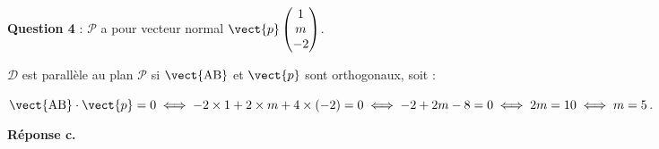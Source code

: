 \medskip

\textbf{Question 4} : %
$\mathcal{P}$ a pour vecteur normal $\vect{p}\begin{pmatrix}1\\m\\-2\end{pmatrix}$.

$\mathcal{D}$ est parallèle au plan $\mathcal{P}$ si $\vect{\text{AB}}$ et $\vect{p}$ sont orthogonaux, soit :

$\vect{\text{AB}} \cdot \vect{p} = 0 \iff -2 \times 1 + 2 \times m + 4 \times (- 2) = 0 \iff - 2 + 2m - 8 = 0 \iff 2m = 10 \iff m = 5$. 

\smallskip

\hfill\textbf{Réponse c.}

\medskip

\bigskip

